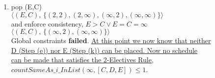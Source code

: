 \documentclass[fleqn]{hermans-hw}
\begin{document}
\begin{enumerate}
\begin{enumerate}
	\item pop (E,C)\\
	$\langle(E,C), \, \lbrace (2,2),(2,\infty),(\infty,2),(\infty,\infty) \rbrace \rangle$\\
	and enforce consistency, $ E > C \vee E=C=\infty $ \\
	$\langle(E,C), \, \lbrace (\infty,2),(\infty,\infty) \rbrace \rangle$\\
	Global constraints \textbf{failed}. \underline{At this point we now know that neither} \\ 
	\underline{D (Step (e)) nor E (Step (k)) can be placed.  Now no schedule}\\ \underline{can be made that satisfies the 2-Electives Rule,}\\ $countSameAs\_i\_InList(\infty,[C,D,E]) \leq 1$.
	
\end{enumerate}




\end{enumerate}


\begin{comment}
\section{Submission Instructions}

\begin{enumerate}

\item For the final submission you would be turning in a \textbf{PDF} document containing all your answers. No other submission format would be accepted. Please have your name written on top of the document. Replace the author name with your name and uID.

\item If you collaborated with a friend or classmate in doing the HW, please specify their names on the top of this document too. We hate the discussion about cheating and so please save all of us the trouble and cite appropriate sources/names.

\item Please ensure all the submissions are done through canvas. Please do not email the instructor or the TA with your submission. Submissions made via email would not be considered for grading.

\item \textbf{Naming: }Your final upload should be named in the format $<uid>$-HW2.pdf where $<uid>$ is your Utah uid. \textbf{Ex:} u0006300-HW2.pdf

\end{enumerate}
\end{comment}
\end{document}
